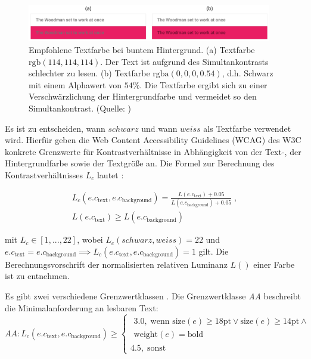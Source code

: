 \begin{figure}[h]
	\centering
	\includegraphics[width=0.95\textwidth]{img/text_color.png}
	\caption{Empfohlene Textfarbe bei buntem Hintergrund. (a) Textfarbe $\text{rgb}(114,114,114)$. Der Text ist aufgrund des Simultankontrasts schlechter zu lesen. (b) Textfarbe $\text{rgba}(0, 0, 0, 0.54)$, d.h. Schwarz mit einem Alphawert  von $54\%$. Die Textfarbe ergibt sich zu einer Verschwärzlichung der Hintergrundfarbe und vermeidet so den Simultankontrast. (Quelle: \citep{google})}
	\label{fig:text_color}
\end{figure}

Es ist zu entscheiden,  wann $schwarz$ und wann $weiss$ als Textfarbe verwendet wird. Hierfür geben die Web Content Accessibility Guidelines (WCAG) des W3C konkrete Grenzwerte für Kontrastverhältnisse in Abhängigkeit von der Text-, der Hintergrundfarbe sowie der Textgröße an. Die Formel zur Berechnung des Kontrastverhältnisses $L_c$ lautet \citep{wcag-contrast}:

\begin{equation}
	\begin{split}
		L_c(e.c_\text{text}, e.c_\text{background}) = \frac{L(e.c_\text{text}) + 0.05}{L(e.c_\text{background}) + 0.05} \;,\\
		L(e.c_\text{text}) \geq L(e.c_\text{background})
	\end{split}
\end{equation}

mit $L_c \in [1, ... , 22]$, wobei $L_c(schwarz, weiss) = 22$ und $e.c_\text{text} = e.c_\text{background} \implies L_c(e.c_\text{text}, e.c_\text{background}) = 1$ gilt. Die Berechnungsvorschrift der normalisierten relativen Luminanz $L()$ einer Farbe ist \citep{wcag-rel-luminance} zu entnehmen.

Es gibt zwei verschiedene Grenzwertklassen \citep{wcag}. Die Grenzwertklasse \emph{AA} beschreibt die Minimalanforderung an lesbaren Text:
\begin{equation}
  	AA: L_c(e.c_\text{text}, e.c_\text{background}) \geq
	\begin{cases}
	\begin{split}
	3.0, \; \text{wenn } \text{size}(e) \geq 18\text{pt} \lor \text{size}(e) \geq 14\text{pt} \land\\ \text{weight}(e) = \text{bold}
	\end{split}\\
		4.5,  \;  \text{sonst}
	\end{cases}
\end{equation}

